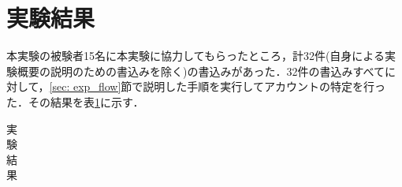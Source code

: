\documentclass[10pt, a4paper]{jreport}
\begin{document}
\section{実験結果}\label{sec: exp_result}
本実験の被験者15名に本実験に協力してもらったところ，計32件(自身による実験概要の説明のための書込みを除く)の書込みがあった．32件の書込みすべてに対して，\ref{sec: exp_flow}節で説明した手順を実行してアカウントの特定を行った．その結果を表\ref{tb: exp_result}に示す．


\begin{table}[H]
	\caption{実験結果}
	\label{tb: exp_result}
	\begin{center}
		\scalebox{0.85} {
			\begin{tabular}{ | c | c | c | c | c | c | c | } \hline


\end{tabular}}
\end{center}
\end{table}
\end{document}
